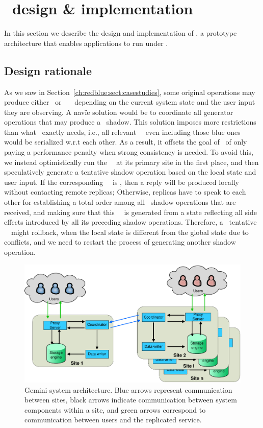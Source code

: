 \section{\gemini\ design \& implementation}
\label{ch:redblue:sect:gemini}

In this section we describe the design and implementation of
  \gemini, a prototype architecture that enables applications to run
  under \RBc.

\subsection{Design rationale}
As we saw in Section~\ref{ch:redblue:sect:casestudies},
some original operations may produce either \blue\ or \red\ \shadow\ \operations\
depending on the current system state and the user input they are observing. 
A nav{\" i}e solution would be to coordinate all generator operations that may produce
a \red{}. This solution imposes more restrictions than
what \RBCN\ exactly needs, i.e., all relevant \shadow\ \operations\ even including
those blue ones would be serialized w.r.t each other. As a result, it
offsets the goal of \RBCN\ of only paying a performance penalty when strong consistency
is needed. To avoid this, we instead optimistically run 
the \initial\ \operation\ at its primary site in the first place,
and then speculatively generate a tentative shadow operation based on the local state and user input.
If the corresponding \shadow\ \operation\ is \blue, then a reply will be produced locally without
contacting remote replicas; Otherwise, replicas have to speak to
each other for establishing a total order among all \red{} operations that are received,
and making sure that this \shadow\ \operation\ is generated
from a state reflecting all side effects introduced by all its preceding shadow operations. Therefore,
a \red\ tentative \shadow\ \operation\ might rollback, when the local state
is different from the global state due to conflicts, and we need to restart
the process of generating another shadow operation.

\begin{figure}[t!]
  \centering
    \includegraphics[width=0.95\columnwidth]{figures/redblue/GeminiArchi.pdf}
  \caption{Gemini system architecture. Blue arrows represent communication between sites,
black arrows indicate communication between system components within a site, and green
arrows correspond to communication between users and the replicated service.}
 \label{fig:geminiMultiDC}
\end{figure}

